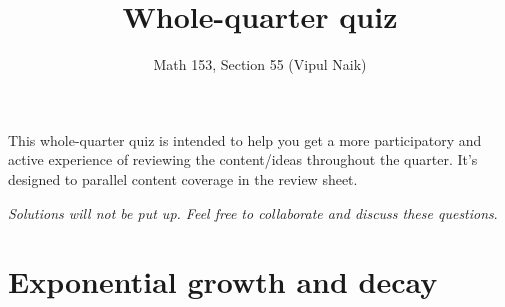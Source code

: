 \documentclass[10pt]{amsart}
\title{Whole-quarter quiz}
\author{Math 153, Section 55 (Vipul Naik)}
\begin{document}
\maketitle

This whole-quarter quiz is intended to help you get a more
participatory and active experience of reviewing the content/ideas
throughout the quarter. It's designed to parallel content coverage in
the review sheet.

{\em Solutions will not be put up. Feel free to collaborate and
discuss these questions}.

\section{Exponential growth and decay}


\item 
\end{document}
